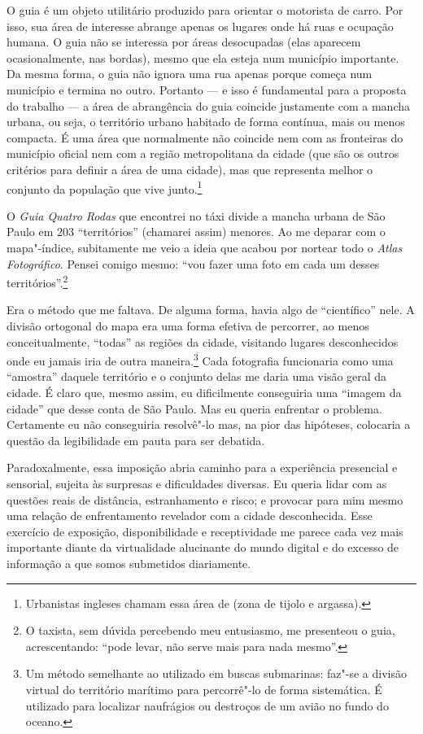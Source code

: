 O guia é um objeto utilitário produzido para orientar o motorista de
carro. Por isso, sua área de interesse abrange apenas os lugares onde há
ruas e ocupação humana. O guia não se interessa por áreas desocupadas
(elas aparecem ocasionalmente, nas bordas), mesmo que ela esteja num
município importante. Da mesma forma, o guia não ignora uma rua apenas
porque começa num município e termina no outro. Portanto --- e isso é
fundamental para a proposta do trabalho --- a área de abrangência do guia
coincide justamente com a mancha urbana, ou seja, o território urbano
habitado de forma contínua, mais ou menos compacta. É uma área que
normalmente não coincide nem com as fronteiras do município oficial nem
com a região metropolitana da cidade (que são os outros critérios para
definir a área de uma cidade), mas que representa melhor o conjunto da
população que vive junto.\footnote{Urbanistas ingleses chamam essa área
  de {} (zona de tijolo e argassa).}

O \emph{Guia Quatro Rodas} que encontrei no táxi divide a mancha urbana
de São Paulo em 203 ``territórios'' (chamarei assim) menores. Ao me
deparar com o mapa"-índice, subitamente me veio a ideia que acabou por
nortear todo o \emph{Atlas Fotográfico}. Pensei comigo mesmo: ``vou
fazer uma foto em cada um desses territórios''.\footnote{O taxista, sem
  dúvida percebendo meu entusiasmo, me presenteou o guia, acrescentando:
  ``pode levar, não serve mais para nada mesmo''.}

Era o método que me faltava. De alguma forma, havia algo de
``científico'' nele. A divisão ortogonal do mapa era uma forma efetiva
de percorrer, ao menos conceitualmente, ``todas'' as regiões da cidade,
visitando lugares desconhecidos onde eu jamais iria de outra
maneira.\footnote{Um método semelhante ao utilizado em buscas
  submarinas: faz"-se a divisão virtual do território marítimo para
  percorrê"-lo de forma sistemática. É utilizado para localizar
  naufrágios ou destroços de um avião no fundo do oceano.} Cada
fotografia funcionaria como uma ``amostra'' daquele território e o
conjunto delas me daria uma visão geral da cidade. É claro que, mesmo
assim, eu dificilmente conseguiria uma ``imagem da cidade'' que desse
conta de São Paulo. Mas eu queria enfrentar o problema. Certamente eu
não conseguiria resolvê"-lo mas, na pior das hipóteses, colocaria a
questão da legibilidade em pauta para ser debatida.

Paradoxalmente, essa imposição abria caminho para a experiência
presencial e sensorial, sujeita às surpresas e dificuldades diversas. Eu
queria lidar com as questões reais de distância, estranhamento e risco;
e provocar para mim mesmo uma relação de enfrentamento revelador com a
cidade desconhecida. Esse exercício de exposição, disponibilidade e
receptividade me parece cada vez mais importante diante da virtualidade
alucinante do mundo digital e do excesso de informação a que somos
submetidos diariamente.

